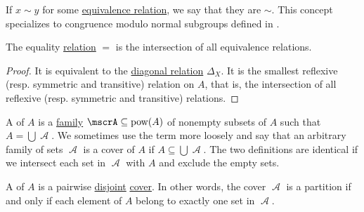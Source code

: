 \begin{remark}\label{rem:congruence_modulo_relation}
  If \( x \sim y \) for some \hyperref[def:equivalence_relation]{equivalence relation}, we say that they are  \( \sim \). This concept specializes to congruence modulo normal subgroups defined in .
\end{remark}

\begin{proposition}\label{thm:equality_is_smallest_equivalence_relation}
  The equality \hyperref[def:binary_relation]{relation} \( = \) is the intersection of all equivalence relations.
\end{proposition}
\begin{proof}
  It is equivalent to the \hyperref[def:binary_relation/diagonal]{diagonal relation} \( \Delta_X \). It is the smallest reflexive (resp. symmetric and transitive) relation on \( A \), that is, the intersection of all reflexive (resp. symmetric and transitive) relations.
\end{proof}

\begin{definition}\label{def:set_cover}
  A  of \( A \) is a \hyperref[rem:family_of_sets]{family} \( \mscrA \subseteq \pow(A) \) of nonempty subsets of \( A \) such that \( A = \bigcup \mscrA \). We sometimes use the term more loosely and say that an arbitrary family of sets \( \mscrA \) is a cover of \( A \) if \( A \subseteq \bigcup \mscrA \). The two definitions are identical if we intersect each set in \( \mscrA \) with \( A \) and exclude the empty sets.
\end{definition}

\begin{definition}\label{def:set_partition}
  A  of \( A \) is a pairwise \hyperref[def:subset]{disjoint} \hyperref[def:set_cover]{cover}. In other words, the cover \( \mscrA \) is a partition if and only if each element of \( A \) belong to exactly one set in \( \mscrA \).
\end{definition}

